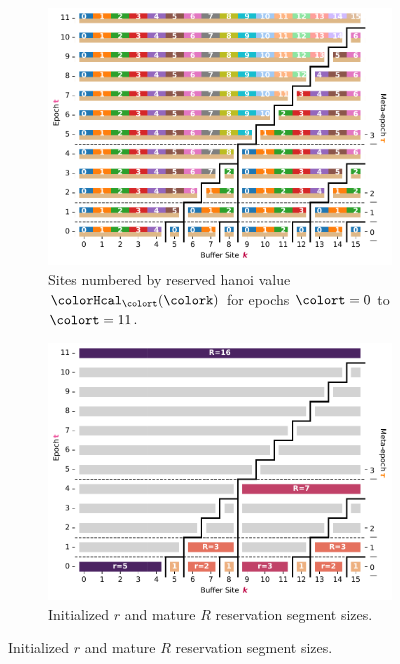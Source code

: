 \begin{figure}[htbp!]
\begin{subfigure}{0.5\textwidth}
\includegraphics[width=\textwidth, clip, trim={0 0 1.25cm 11.2cm}]{binder/teeplots/20/surface-size=16+viz=site-reservation-at-ranks-heatmap+ext=}
\caption{\footnotesize Sites numbered by reserved hanoi value $\colorHcal_{\colort}(\colork)$ for epochs $\colort=0$ to $\colort=11$.}
\label{fig:hsurf-stretched-intuition-reservations}
\end{subfigure}%
\begin{subfigure}{0.5\textwidth}
\includegraphics[width=\textwidth, clip, trim={1.25cm 0 0 11.2cm}]{binder/teeplots/20/plotter=size+surface-size=16+viz=site-reservation-at-ranks-heatmap+ext=}
\caption{\footnotesize Initialized $r$ and mature $R$ reservation segment sizes.}

\end{subfigure}
\end{figure}
